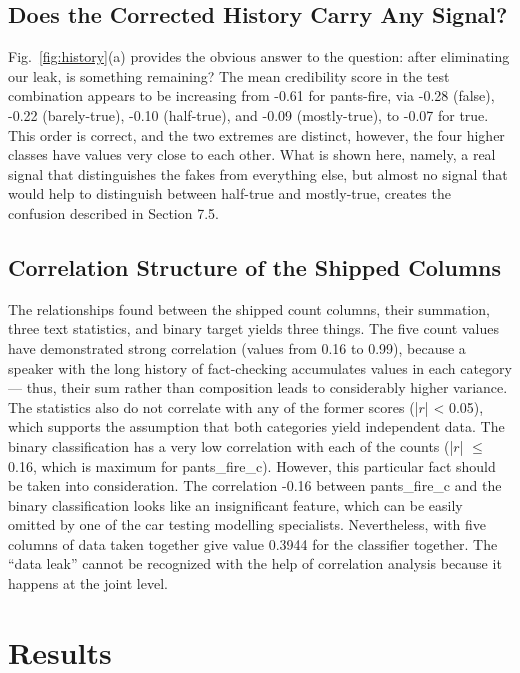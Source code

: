 \subsection{Does the Corrected History Carry Any Signal?}

Fig.~\ref{fig:history}(a) provides the obvious answer to the question: after eliminating our leak, is something remaining? The mean credibility score in the test combination appears to be increasing from -0.61 for pants-fire, via -0.28 (false), -0.22 (barely-true), -0.10 (half-true), and -0.09 (mostly-true), to -0.07 for true. This order is correct, and the two extremes are distinct, however, the four higher classes have values very close to each other. What is shown here, namely, a real signal that distinguishes the fakes from everything else, but almost no signal that would help to distinguish between half-true and mostly-true, creates the confusion described in Section 7.5.

\subsection{Correlation Structure of the Shipped Columns}

The relationships found between the shipped count columns, their summation, three text statistics, and binary target yields three things. The five count values have demonstrated strong correlation (values from 0.16 to 0.99), because a speaker with the long history of fact-checking accumulates values in each category --- thus, their sum rather than composition leads to considerably higher variance. The statistics also do not correlate with any of the former scores (|$r$| < 0.05), which supports the assumption that both categories yield independent data. The binary classification has a very low correlation with each of the counts (|$r$| $\le$ 0.16, which is maximum for pants\_fire\_c). However, this particular fact should be taken into consideration. The correlation -0.16 between pants\_fire\_c and the binary classification looks like an insignificant feature, which can be easily omitted by one of the car testing modelling specialists. Nevertheless, with five columns of data taken together give value 0.3944 for the classifier together. The ``data leak'' cannot be recognized with the help of correlation analysis because it happens at the joint level.

\section{Results}


